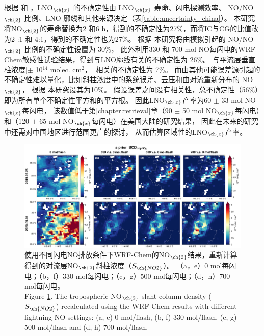 根据 \citet{Allen.2019} 和 \citet{Zhang.2020b}，LNO$_{\ch{x}}$ 的不确定性由 LNO$_{\ch{x}}$ 寿命、闪电探测效率、
NO/NO$_{\ch{2}}$ 比例、LNO 廓线和其他来源决定（表\ref{table:uncertainty_china}）。
本研究将NO$_{\ch{2}}$的寿命替换为2 和6 h，得到的不确定性为27\%，而将IC与CG的比值改为2 :1 和 4:1，得到的不确定性也为27\%。
根据 \citet{Allen.2019} 本研究将由模拟引起的 NO/NO$_{\ch{2}}$ 比例的不确定性设置为 30\%，
此外利用330 和 700 mol NO每闪电的WRF-Chem敏感性试验结果，得到与LNO廓线有关的不确定性为 26\%。
与平流层垂直柱浓度[$\pm$ 10$^{14}$ molec. cm$^2$， \citet{VanGeffen.2022}]相关的不确定性为 7\%。
而由其他可能误差源引起的不确定性难以量化，比如斜柱浓度中的系统误差、云压和由对流重新分布的 NO$_{\ch{2}}$，
根据 \citet{Allen.2021a}本研究设其为10\%。
假设误差之间没有相关性，总不确定性（56\%）即为所有单个不确定性平方和的平方根。
因此LNO$_{\ch{x}}$产率为60 $\pm$ 33 mol NO$_{\ch{x}}$每闪电，
该数值低于第\ref{chapter:retrieval}章（90 $\pm$ 50 mol NO$_{\ch{x}}$每闪电）和\citet{Allen.2021a}（120 $\pm$ 65 mol NO$_{\ch{x}}$每闪电）在美国大陆的研究结果，
因此在未来的研究中还需对中国地区进行范围更广的探讨，
从而估算区域性的LNO$_{\ch{x}}$产率。


\begin{landscape}
\vspace*{\fill}
\begin{figure}[H]
    \centering
    \includegraphics[width=0.9\columnwidth]{./figures/s5p_apriori_scd.png}
    \caption{使用不同闪电NO排放条件下WRF-Chem的NO$_{\ch{2}}$结果，重新计算得到的对流层NO$_{\ch{2}}$斜柱浓度（$S_{\ch{NO2}}$）。
    （a，e）0 mol每闪电；（b，f）330 mol每闪电；（c，g）500 mol每闪电；（d，h）700 mol每闪电。\\
    Figure \ref{fig:s5p_apriori_scd}. The tropospheric NO$_{\ch{2}}$ slant column density ($S_{\ch{NO2}}$) recalculated using the WRF-Chem results with different lightning NO settings: (a, e) 0 mol/flash, (b, f) 330 mol/flash, (c, g) 500 mol/flash and (d, h) 700 mol/flash.
    }
    \label{fig:s5p_apriori_scd}
\end{figure}
\vspace*{\fill}
\end{landscape}

